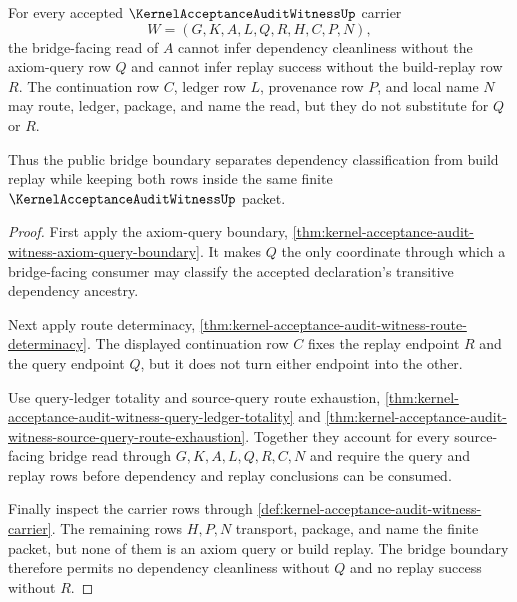 \begin{theorem}
\label{thm:kernel-acceptance-audit-witness-bridge-query-replay-boundary}
For every accepted $\KernelAcceptanceAuditWitnessUp$ carrier
$$
W=(G,K,A,L,Q,R,H,C,P,N),
$$
the bridge-facing read of $A$ cannot infer dependency cleanliness without the axiom-query row $Q$ and cannot infer replay success without the build-replay row $R$. The continuation row $C$, ledger row $L$, provenance row $P$, and local name $N$ may route, ledger, package, and name the read, but they do not substitute for $Q$ or $R$.

Thus the public bridge boundary separates dependency classification from build replay while keeping both rows inside the same finite $\KernelAcceptanceAuditWitnessUp$ packet.
\end{theorem}
\begin{proof}
First apply the axiom-query boundary, \autoref{thm:kernel-acceptance-audit-witness-axiom-query-boundary}. It makes $Q$ the only coordinate through which a bridge-facing consumer may classify the accepted declaration's transitive dependency ancestry.

Next apply route determinacy, \autoref{thm:kernel-acceptance-audit-witness-route-determinacy}. The displayed continuation row $C$ fixes the replay endpoint $R$ and the query endpoint $Q$, but it does not turn either endpoint into the other.

Use query-ledger totality and source-query route exhaustion, \autoref{thm:kernel-acceptance-audit-witness-query-ledger-totality} and \autoref{thm:kernel-acceptance-audit-witness-source-query-route-exhaustion}. Together they account for every source-facing bridge read through $G,K,A,L,Q,R,C,N$ and require the query and replay rows before dependency and replay conclusions can be consumed.

Finally inspect the carrier rows through \autoref{def:kernel-acceptance-audit-witness-carrier}. The remaining rows $H,P,N$ transport, package, and name the finite packet, but none of them is an axiom query or build replay. The bridge boundary therefore permits no dependency cleanliness without $Q$ and no replay success without $R$.
\end{proof}

